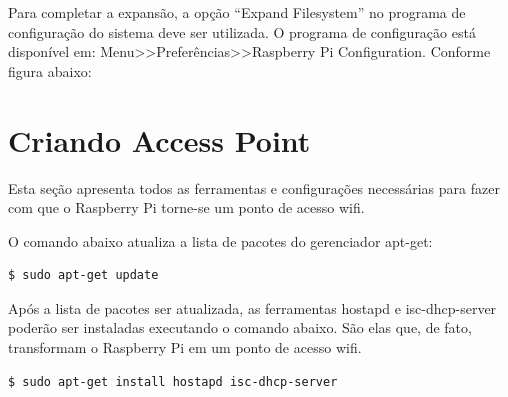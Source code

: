 Para completar a expansão, a opção ``Expand Filesystem'' no programa de configuração do sistema deve ser utilizada. O programa de configuração está disponível em: Menu>>Preferências>>Raspberry Pi Configuration. Conforme figura abaixo:

\begin{figure}[h!]
	\centering
\end{figure}

\section{Criando Access Point}
\label{sec:access-point}

Esta seção apresenta todos as ferramentas e configurações necessárias para fazer com que o Raspberry Pi torne-se um ponto de acesso wifi.

O comando abaixo atualiza a lista de pacotes do gerenciador apt-get: \\

\begin{lstlisting}[language=bash]
$ sudo apt-get update
\end{lstlisting}

Após a lista de pacotes ser atualizada, as ferramentas hostapd e isc-dhcp-server poderão ser instaladas executando o comando abaixo. São elas que, de fato, transformam o Raspberry Pi em um ponto de acesso wifi. \\

\begin{lstlisting}[language=bash]
$ sudo apt-get install hostapd isc-dhcp-server
\end{lstlisting}

